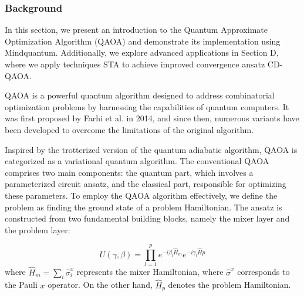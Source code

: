 


\subsubsection{Background}

In this section, we present an introduction to the Quantum Approximate Optimization Algorithm (QAOA) and demonstrate its implementation using Mindquantum. Additionally, we explore advanced applications in Section D, where we apply techniques STA to achieve improved convergence ansatz CD-QAOA\cite{PhysRevResearch.4.013141}.


QAOA is a powerful quantum algorithm designed to address combinatorial optimization problems by harnessing the capabilities of quantum computers. It was first proposed by Farhi et al. in 2014\cite{farhi2014quantum}, and since then, numerous variants have been developed to overcome the limitations of the original algorithm.

Inspired by the trotterized version of the quantum adiabatic algorithm, QAOA is categorized as a variational quantum algorithm. The conventional QAOA comprises two main components: the quantum part, which involves a parameterized circuit ansatz, and the classical part, responsible for optimizing these parameters. To employ the QAOA algorithm effectively, we define the problem as finding the ground state of a problem Hamiltonian. The ansatz is constructed from two fundamental building blocks, namely the mixer layer and the problem layer:

\begin{equation}
    U(\gamma, \beta) = \prod_{l=1}^p e^{-i\beta_l \hat{H}_{m}}e^{-i\gamma_l\hat{H}{{p}}}
\end{equation}
where $\hat{H}_{{m}} = \sum_i \hat{\sigma}^x_i$ represents the mixer Hamiltonian, where $\hat{\sigma}^x$ corresponds to the Pauli $x$ operator. On the other hand, $\hat{H}_{{p}}$ denotes the problem Hamiltonian.

